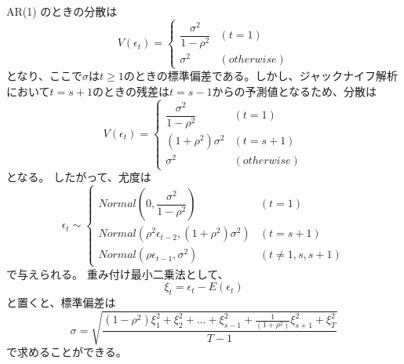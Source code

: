 \documentclass{jsarticle}
\begin{document}
AR(1) のときの分散は
\begin{equation}
V({\epsilon}_t) = 
\begin{cases}
\dfrac{\sigma ^2}{1 - \rho ^2} & (t = 1) \\
\sigma ^2 & (otherwise)
\end{cases}
\end{equation}
となり、ここで$\sigma$は$t \geq 1$のときの標準偏差である。しかし、ジャックナイフ解析において$t = s + 1$のときの残差は$t = s - 1$からの予測値となるため、分散は
\begin{equation}
V({\epsilon}_t) = 
\begin{cases}
\dfrac{\sigma ^2}{1 - \rho ^2} & (t = 1) \\
(1 + \rho ^2) \sigma ^2 & (t = s + 1) \\
\sigma ^2 & (otherwise)
\end{cases}
\end{equation}
となる。
したがって、尤度は
\begin{equation}
{\epsilon}_t \sim 
\begin{cases}
Normal \left( 0, \dfrac{\sigma ^2}{1 - \rho ^2} \right) & (t = 1) \\
Normal \left(\rho^2 \epsilon_{t-2}, (1 + \rho ^2) \sigma ^2 \right) & (t = s + 1) \\
Normal \left(\rho \epsilon_{t-1}, \sigma ^2 \right) & (t \neq 1, s, s+1)
\end{cases}
\end{equation}
で与えられる。
重み付け最小二乗法として、
$$ \xi _t = \epsilon _t - E( \epsilon_t ) $$
と置くと、標準偏差は
\begin{equation}
\sigma = \sqrt{ \frac{\left( 1 - \rho ^ 2 \right) \xi _{1} ^ 2 + \xi _{2} ^ 2 + ... + \xi _{s-1} ^ 2 + \tfrac{1}{(1 + \rho ^2)} \xi _{s+1} ^ 2 + \xi _{T} ^ 2}{T - 1}} 
\end{equation}
で求めることができる。
\end{document}

